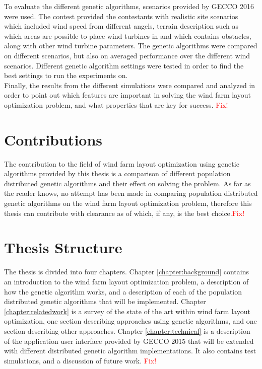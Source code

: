 \noindent To evaluate the different genetic algorithms, scenarios provided by GECCO 2016 were used. The contest provided the contestants with realistic site scenarios which included wind speed from different angels, terrain description such as which areas are possible to place wind turbines in and which contains obstacles, along with other wind turbine parameters. The genetic algorithms were compared on different scenarios, but also on averaged performance over the different wind scenarios. Different genetic algorithm settings were tested in order to find the best settings to run the experiments on.\\

\noindent Finally, the results from the different simulations were compared and analyzed in order to point out which features are important in solving the wind farm layout optimization problem, and what properties that are key for success. \textcolor{red}{Fix!}


\section{Contributions}\label{section:contributions}
The contribution to the field of wind farm layout optimization using genetic algorithms provided by this thesis is a comparison of different population distributed genetic algorithms and their effect on solving the problem. As far as the reader knows, no attempt has been made in comparing population distributed genetic algorithms on the wind farm layout optimization problem, therefore this thesis can contribute with clearance as of which, if any, is the best choice.\textcolor{red}{Fix!}


\section{Thesis Structure}\label{thesisstructure}
The thesis is divided into four chapters. Chapter \ref{chapter:background} contains an introduction to the wind farm layout optimization problem, a description of how the genetic algorithm works, and a description of each of the population distributed genetic algorithms that will be implemented. Chapter \ref{chapter:relatedwork} is a survey of the state of the art within wind farm layout optimization, one section describing approaches using genetic algorithms, and one section describing other approaches. Chapter \ref{chapter:technical} is a description of the application user interface provided by GECCO 2015 that will be extended with different distributed genetic algorithm implementations. It also contains test simulations, and a discussion of future work. \textcolor{red}{Fix!}